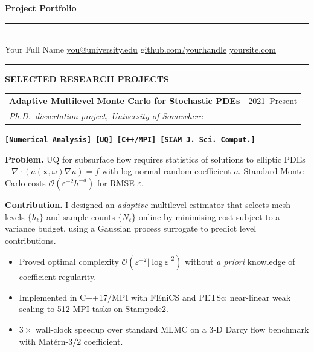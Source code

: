 \documentclass[10pt,letterpaper]{article}
\makeatletter
\newcommand{\pfsection}[1]{%
  \needspace{6\baselineskip}%
  \vspace{6pt}%
  {\color{NavyDeep}\rule{\linewidth}{0.8pt}\par}%
  \vspace{-2pt}%
  {\color{NavyDeep}\large\bfseries\MakeUppercase{#1}\par}%
  \vspace{3pt}%
}
\newcommand{\projecthead}[3]{%
  \noindent
  \begin{tabularx}{\linewidth}{@{}X r@{}}
    {\large\bfseries\color{NavyDeep}#1} & {\small\color{SubtleGray}#3}\\[-2pt]
    {\small\itshape\color{AccentTeal}#2} & \\
  \end{tabularx}%
  \vspace{2pt}%
}
\newcommand{\cvtag}[1]{%
  \mbox{\small\bfseries\color{AccentTeal}\texttt{[#1]}}\,%
}
\newcommand{\eq}[1]{$#1$}
\makeatother
\begin{document}
\begin{center}
  {\fontsize{20}{24}\selectfont\bfseries\color{NavyDeep} Project Portfolio}\\[3pt]
  {\color{AccentTeal}\rule{3cm}{1pt}}\\[4pt]
  {\small\color{SubtleGray}
    Your Full Name\enspace\textbar\enspace
    \href{mailto:you@university.edu}{you@university.edu}\enspace\textbar\enspace
    \href{https://github.com/yourhandle}{github.com/yourhandle}\enspace\textbar\enspace
    \href{https://yoursite.com}{yoursite.com}
  }
\end{center}
\vspace{4pt}

\pfsection{Selected Research Projects}

\projecthead
  {Adaptive Multilevel Monte Carlo for Stochastic PDEs}
  {Ph.D.\ dissertation project, University of Somewhere}
  {2021--Present}

\noindent\cvtag{Numerical Analysis} \cvtag{UQ} \cvtag{C++/MPI} \cvtag{SIAM J.\ Sci.\ Comput.}

\vspace{4pt}
\textbf{Problem.}\enspace
UQ for subsurface flow requires statistics of solutions to elliptic PDEs
\eq{-\nabla\cdot(a(\mathbf{x},\omega)\nabla u)=f} with log-normal random coefficient \eq{a}.
Standard Monte Carlo costs \eq{\mathcal{O}(\varepsilon^{-2}h^{-d})} for RMSE \eq{\varepsilon}.

\textbf{Contribution.}\enspace
I designed an \emph{adaptive} multilevel estimator that selects mesh levels
\eq{\{h_\ell\}} and sample counts \eq{\{N_\ell\}} online by minimising cost subject to
a variance budget, using a Gaussian process surrogate to predict level contributions.

\begin{itemize}
  \item Proved optimal complexity \eq{\mathcal{O}(\varepsilon^{-2}|\log\varepsilon|^2)}
        without \emph{a priori} knowledge of coefficient regularity.
  \item Implemented in C++17/MPI with FEniCS and PETSc; near-linear weak scaling to
        512 MPI tasks on Stampede2.
  \item \eq{3\times} wall-clock speedup over standard MLMC on a 3-D Darcy flow benchmark
        with Mat\'{e}rn-\eq{3/2} coefficient.
\end{itemize}
\end{document}

